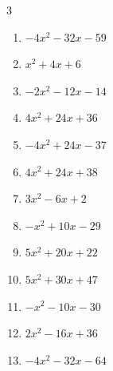 \begin{multicols}{3}
\begin{enumerate}

  \item $-4x^{2}-32x-59$


  \item $x^{2}+4x+6$


  \item $-2x^{2}-12x-14$


  \item $4x^{2}+24x+36$


  \item $-4x^{2}+24x-37$


  \item $4x^{2}+24x+38$


  \item $3x^{2}-6x+2$


  \item $-x^{2}+10x-29$


\columnbreak %

  \item $5x^{2}+20x+22$


  \item $5x^{2}+30x+47$


  \item $-x^{2}-10x-30$


  \item $2x^{2}-16x+36$


  \item $-4x^{2}-32x-64$



\end{enumerate}
\end{multicols}

